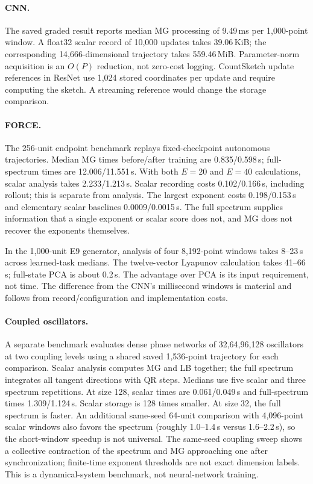 {\paragraph{CNN.}
The saved graded result reports median MG processing of 9.49\,ms per 1,000-point window. A float32 scalar record of 10,000 updates takes 39.06\,KiB; the corresponding 14,666-dimensional trajectory takes 559.46\,MiB. Parameter-norm acquisition is an $O(P)$ reduction, not zero-cost logging. CountSketch update references in ResNet use 1,024 stored coordinates per update and require computing the sketch. A streaming reference would change the storage comparison.

\paragraph{FORCE.}
The 256-unit endpoint benchmark replays fixed-checkpoint autonomous trajectories. Median MG times before/after training are 0.835/0.598\,s; full-spectrum times are 12.006/11.551\,s. With both $E=20$ and $E=40$ calculations, scalar analysis takes 2.233/1.213\,s. Scalar recording costs 0.102/0.166\,s, including rollout; this is separate from analysis. The largest exponent costs 0.198/0.153\,s and elementary scalar baselines 0.0009/0.0015\,s. The full spectrum supplies information that a single exponent or scalar score does not, and MG does not recover the exponents themselves.

In the 1,000-unit E9 generator, analysis of four 8,192-point windows takes 8--23\,s across learned-task medians. The twelve-vector Lyapunov calculation takes 41--66\,s; full-state PCA is about 0.2\,s. The advantage over PCA is its input requirement, not time. The difference from the CNN's millisecond windows is material and follows from record/configuration and implementation costs.

\paragraph{Coupled oscillators.}
A separate benchmark evaluates dense phase networks of 32,64,96,128 oscillators at two coupling levels using a shared saved 1,536-point trajectory for each comparison. Scalar analysis computes MG and LB together; the full spectrum integrates all tangent directions with QR steps. Medians use five scalar and three spectrum repetitions. At size 128, scalar times are 0.061/0.049\,s and full-spectrum times 1.309/1.124\,s. Scalar storage is 128 times smaller. At size 32, the full spectrum is faster. An additional same-seed 64-unit comparison with 4,096-point scalar windows also favors the spectrum (roughly 1.0--1.4\,s versus 1.6--2.2\,s), so the short-window speedup is not universal. The same-seed coupling sweep shows a collective contraction of the spectrum and MG approaching one after synchronization; finite-time exponent thresholds are not exact dimension labels. This is a dynamical-system benchmark, not neural-network training.

}
